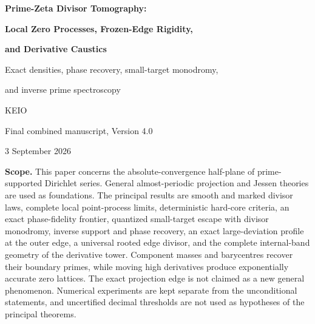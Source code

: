 \documentclass[11pt]{article}
\theoremstyle{definition}
\theoremstyle{remark}
\begin{document}
\hypersetup{pageanchor=false}

\begin{titlepage}
\centering
\vspace*{1.0in}
{\huge\bfseries\color{ink} Prime-Zeta Divisor Tomography:\par}
\vspace{0.10in}
{\huge\bfseries\color{ink} Local Zero Processes, Frozen-Edge Rigidity,\par}
\vspace{0.10in}
{\huge\bfseries\color{ink} and Derivative Caustics\par}
\vspace{0.36in}
{\Large Exact densities, phase recovery, small-target monodromy,\par
and inverse prime spectroscopy\par}
\vspace{0.8in}
{\large KEIO\par}
\vspace{0.25in}
{\large Final combined manuscript, Version 4.0\par}
\vspace{0.08in}
{\large 3 September 2026\par}
\vfill
\begin{minipage}{0.88\textwidth}
\small
\textbf{Scope.}
This paper concerns the absolute-convergence half-plane of prime-supported Dirichlet
series.  General almost-periodic projection and Jessen theories are used as foundations.
The principal results are smooth and marked divisor laws, complete local point-process
limits, deterministic hard-core criteria, an exact phase-fidelity frontier, quantized
small-target escape with divisor monodromy, inverse support and phase recovery,
an exact large-deviation profile at the outer edge, a universal rooted edge divisor,
and the complete internal-band geometry of the derivative tower.
Component masses and barycentres recover their boundary primes, while moving high
derivatives produce exponentially accurate zero lattices.  The exact projection edge is
not claimed as a new general phenomenon.  Numerical experiments are kept separate
from the unconditional statements, and uncertified decimal thresholds are not used as
hypotheses of the principal theorems.
\end{minipage}
\vfill
\end{titlepage}

\hypersetup{pageanchor=true}
\end{document}
